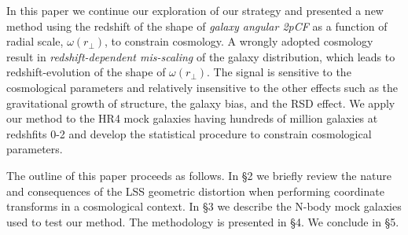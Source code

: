 \documentclass[iop]{emulateapj}
\begin{document}
In this paper we continue our exploration of our strategy and presented 
a new method using the redshift of the shape of {\it galaxy angular 2pCF} as a function of radial scale, $\omega(r_{\bot})$,
to constrain cosmology.
A wrongly adopted cosmology result in {\it redshift-dependent mis-scaling} of the galaxy distribution,
which leads to redshift-evolution of the shape of $\omega(r_{\bot})$.
The signal is sensitive to the cosmological parameters and relatively insensitive to the other effects such as the gravitational growth of structure,
the galaxy bias, and the RSD effect.
We apply our method to the HR4 mock galaxies having hundreds of million galaxies at redshfits 0-2
and develop the statistical procedure to constrain cosmological parameters.
 


The outline of this paper proceeds as follows. 
In \S 2 we briefly review the nature and consequences of the LSS geometric distortion when performing coordinate transforms in a cosmological context. 
In \S 3 we describe the N-body mock galaxies used to test our method.
The methodology is presented in \S 4.
We conclude in \S 5.
\end{document}
